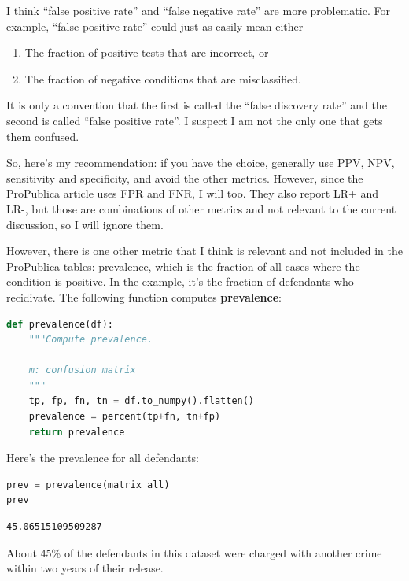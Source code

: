I think ``false positive rate'' and ``false negative rate'' are more
problematic. For example, ``false positive rate'' could just as easily
mean either

\begin{enumerate}
\def\labelenumi{\arabic{enumi}.}
\item
  The fraction of positive tests that are incorrect, or
\item
  The fraction of negative conditions that are misclassified.
\end{enumerate}

It is only a convention that the first is called the ``false discovery
rate'' and the second is called ``false positive rate''. I suspect I am
not the only one that gets them confused.

So, here's my recommendation: if you have the choice, generally use PPV,
NPV, sensitivity and specificity, and avoid the other metrics. However,
since the ProPublica article uses FPR and FNR, I will too. They also
report LR+ and LR-, but those are combinations of other metrics and not
relevant to the current discussion, so I will ignore them.

However, there is one other metric that I think is relevant and not
included in the ProPublica tables: prevalence, which is the fraction of
all cases where the condition is positive. In the example, it's the
fraction of defendants who recidivate. The following function computes
\textbf{prevalence}:

\begin{lstlisting}[language=Python,style=source]
def prevalence(df):
    """Compute prevalence.
    
    m: confusion matrix
    """
    tp, fp, fn, tn = df.to_numpy().flatten()
    prevalence = percent(tp+fn, tn+fp)
    return prevalence
\end{lstlisting}

Here's the prevalence for all defendants:

\begin{lstlisting}[language=Python,style=source]
prev = prevalence(matrix_all)
prev
\end{lstlisting}

\begin{lstlisting}[style=output]
45.06515109509287
\end{lstlisting}

About 45\% of the defendants in this dataset were charged with another
crime within two years of their release.

